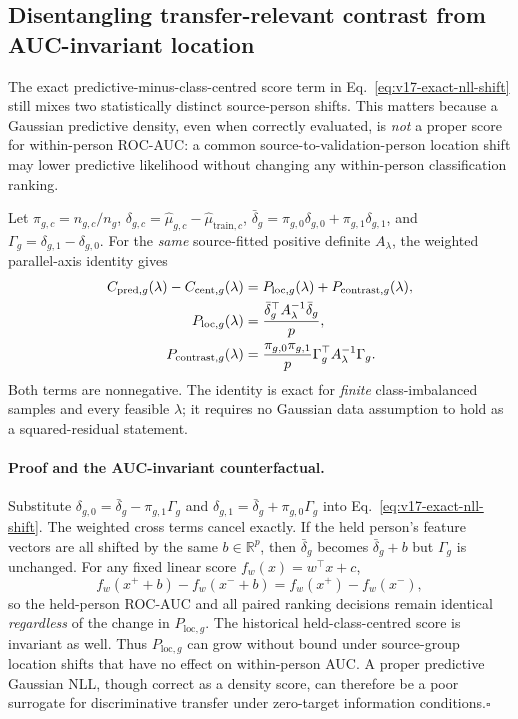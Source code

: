 \subsection{Disentangling transfer-relevant contrast from AUC-invariant location}
\label{sec:bspc-twofactor}
The exact predictive-minus-class-centred score term in
Eq.~\eqref{eq:v17-exact-nll-shift} still mixes two statistically
distinct source-person shifts. This matters because a
Gaussian predictive density, even when correctly evaluated,
is \emph{not} a proper score for within-person ROC-AUC:
a common source-to-validation-person location shift may
lower predictive likelihood without changing any within-person
classification ranking.

Let $\pi_{g,c}=n_{g,c}/n_g$,
$\delta_{g,c}=\widehat\mu_{g,c}-
\widehat\mu_{\mathrm{train},c}$,
$\bar\delta_g=\pi_{g,0}\delta_{g,0}+
               \pi_{g,1}\delta_{g,1}$,
and $\Gamma_g=\delta_{g,1}-\delta_{g,0}$.
For the \emph{same} source-fitted positive definite
$A_\lambda$, the weighted parallel-axis identity gives
\begin{align}
C_{\mathrm{pred},g}(\lambda)
-C_{\mathrm{cent},g}(\lambda)
&=P_{\mathrm{loc},g}(\lambda)
  +P_{\mathrm{contrast},g}(\lambda),\label{eq:twofactor}\\
P_{\mathrm{loc},g}(\lambda)
&={\bar\delta_g^\top A_\lambda^{-1}\bar\delta_g\over p},\\
P_{\mathrm{contrast},g}(\lambda)
&={\pi_{g,0}\pi_{g,1}\over p}
  \Gamma_g^\top A_\lambda^{-1}\Gamma_g.
\end{align}
Both terms are nonnegative. The identity is exact for
\emph{finite} class-imbalanced samples and every
feasible $\lambda$; it requires no Gaussian data
assumption to hold as a squared-residual statement.

\paragraph{Proof and the AUC-invariant counterfactual.}
Substitute
$\delta_{g,0}=\bar\delta_g-\pi_{g,1}\Gamma_g$ and
$\delta_{g,1}=\bar\delta_g+\pi_{g,0}\Gamma_g$ into
Eq.~\eqref{eq:v17-exact-nll-shift}. The weighted cross
terms cancel exactly. If the held person's feature
vectors are all shifted by the same $b\in\mathbb R^p$,
then $\bar\delta_g$ becomes $\bar\delta_g+b$ but
$\Gamma_g$ is unchanged. For any fixed linear
score $f_w(x)=w^\top x+c$,
\[
 f_w(x^+ +b)-f_w(x^- +b)
 = f_w(x^+)-f_w(x^-),
\]
so the held-person ROC-AUC and all paired ranking
decisions remain identical \emph{regardless} of the
change in $P_{\mathrm{loc},g}$. The historical
held-class-centred score is invariant as well.
Thus $P_{\mathrm{loc},g}$ can grow without bound
under source-group location shifts that have no
effect on within-person AUC. A proper predictive
Gaussian NLL, though correct as a density score,
can therefore be a poor surrogate for
discriminative transfer under zero-target
information conditions.\hfill$\square$

